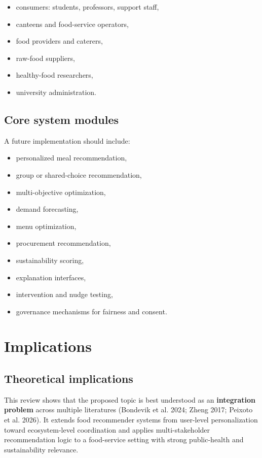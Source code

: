 \documentclass[
  letterpaper,
  DIV=11,
  numbers=noendperiod]{scrartcl}
\providecommand{\tightlist}{%
  \setlength{\itemsep}{0pt}\setlength{\parskip}{0pt}}
\begin{document}
\begin{itemize}
\tightlist
\item
  consumers: students, professors, support staff,
\item
  canteens and food-service operators,
\item
  food providers and caterers,
\item
  raw-food suppliers,
\item
  healthy-food researchers,
\item
  university administration.
\end{itemize}

\subsection{Core system modules}\label{core-system-modules}

A future implementation should include:

\begin{itemize}
\tightlist
\item
  personalized meal recommendation,
\item
  group or shared-choice recommendation,
\item
  multi-objective optimization,
\item
  demand forecasting,
\item
  menu optimization,
\item
  procurement recommendation,
\item
  sustainability scoring,
\item
  explanation interfaces,
\item
  intervention and nudge testing,
\item
  governance mechanisms for fairness and consent.
\end{itemize}

\section{Implications}\label{implications}

\subsection{Theoretical implications}\label{theoretical-implications}

This review shows that the proposed topic is best understood as an
\textbf{integration problem} across multiple literatures ({Bondevik et
al.} 2024; Zheng 2017; {Peixoto et al.} 2026). It extends food
recommender systems from user-level personalization toward
ecosystem-level coordination and applies multi-stakeholder
recommendation logic to a food-service setting with strong public-health
and sustainability relevance.
\end{document}
